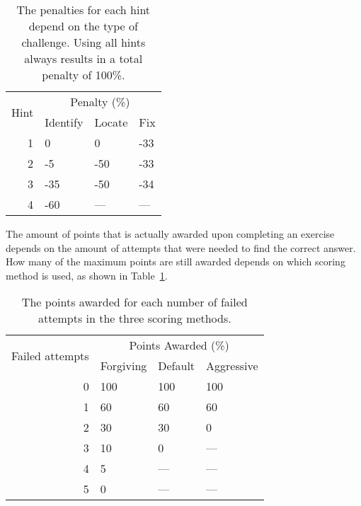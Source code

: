 \begin{table}
\centering
\caption[Penalty for using hints]{The penalties for each hint depend on the type of challenge. Using all hints always results in a total penalty of 100\%.}
\begin{tabular}{r|lll} 
 \multirow{2}{*}{Hint} & \multicolumn{3}{c}{Penalty (\%)}\\
 & {Identify} & Locate & Fix \\
 \hline
 1 & 0 & 0 & -33\\
 2 & -5 & -50 & -33\\
 3 & -35 & -50 & -34\\
 4 & -60 & --- & --- \\
\end{tabular}
\end{table}

The amount of points that is actually awarded upon completing an exercise depends on the amount of attempts that were needed to find the correct answer. How many of the maximum points are still awarded depends on which scoring method is used, as shown in Table~\ref{tb:scoring-attempts}.

\begin{table}
\centering
\caption[Penalty for failed attempts]{The points awarded for each number of failed attempts in the three scoring methods.}
\begin{tabular}{r|lll} 
 \multirow{2}{*}{Failed attempts} & \multicolumn{3}{c}{Points Awarded (\%)}\\
 & Forgiving & Default & Aggressive \\
 \hline
 0 & 100 & 100 & 100\\
 1 & 60 & 60 & 60\\
 2 & 30 & 30 & 0\\
 3 & 10 & 0  & --- \\
 4 & 5  & --- & --- \\
 5 & 0  & --- & --- \\
\end{tabular}

\label{tb:scoring-attempts}
\end{table}


